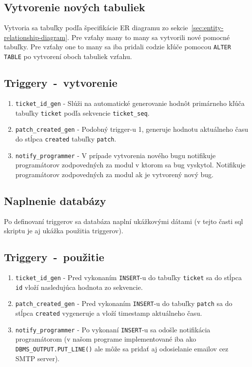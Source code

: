 \documentclass[11pt, a4paper]{article}
\begin{document}
    \subsection{Vytvorenie nových tabuliek}\label{subsec:vytvorenie-nových-tabulieknull}

    Vytvoria sa tabuľky podľa špecifikácie ER diagramu zo sekcie~\ref{sec:entity-relationship-diagram}.
    Pre vzťahy many to many sa vytvorili nové pomocné tabuľky.
    Pre vzťahy one to many sa iba pridali codzie kľúče pomocou \texttt{ALTER TABLE} po vytvorení oboch tabuliek vzťahu.

    \subsection{Triggery\ -\ vytvorenie}\label{subsec:triggery}

    \begin{enumerate}
        \item \texttt{ticket\_id\_gen} -
        Slúži na automatické generovanie hodnôt primárneho kľúča tabuľky \texttt{ticket} podľa sekvencie \texttt{ticket\_seq}.
        \item \texttt{patch\_created\_gen} -
        Podobný trigger-u 1, generuje hodnotu aktuálneho času do stĺpca \texttt{created} tabuľky \texttt{patch}.
        \item \texttt{notify\_programmer} -
        V prípade vytvorenia nového bugu notifikuje programátorov zodpovedných za modul v ktorom sa bug vyskytol.
        Notifikuje programátorov zodpovedných za modul ak je vytvorený nový bug.
    \end{enumerate}

    \subsection{Naplnenie databázy}\label{subsec:naplnenie-databázy}

    Po definovaní triggerov sa databáza naplní ukážkovými dátami (v tejto časti sql skriptu je aj ukážka použitia triggerov).

    \subsection{Triggery\ -\ použitie}\label{subsec:triggery---použitie}

    \begin{enumerate}
        \item \texttt{ticket\_id\_gen} -
        Pred vykonaním \texttt{INSERT}-u do tabuľky \texttt{ticket} sa do stĺpca \texttt{id} vloží nasledujúca hodnota zo sekvencie.
        \item \texttt{patch\_created\_gen} -
        Pred vykonaním \texttt{INSERT}-u do tabuľky \texttt{patch} sa do stĺpca \texttt{created} vygeneruje a vloží timestamp aktuálneho času.
        \item \texttt{notify\_programmer} -
        Po vykonaní \texttt{INSERT}-u sa odošle notifikácia programátorom (v našom programe implementované iba ako \texttt{DBMS\_OUTPUT.PUT\_LINE()} ale môže sa pridať aj odosielanie emailov cez SMTP server).
    \end{enumerate}
\end{document}
